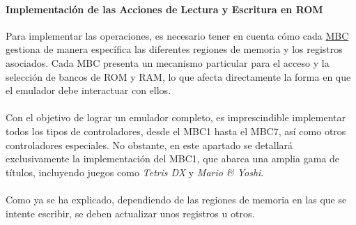 \paragraph{Implementación de las Acciones de Lectura y Escritura en ROM}
Para implementar las operaciones, es necesario tener en cuenta cómo cada \hyperref[history_mbcs]{MBC} gestiona de manera específica las diferentes regiones de memoria y los registros asociados. Cada MBC presenta un mecanismo particular para el acceso y la selección de bancos de ROM y RAM, lo que afecta directamente la forma en que el emulador debe interactuar con ellos.
\\\\
Con el objetivo de lograr un emulador completo, es imprescindible implementar todos los tipos de controladores, desde el MBC1 hasta el MBC7, así como otros controladores especiales. No obstante, en este apartado se detallará exclusivamente la implementación del MBC1, que abarca una amplia gama de títulos, incluyendo juegos como \textit{Tetris DX} y \textit{Mario \& Yoshi}.
\\\\
Como ya se ha explicado, dependiendo de las regiones de memoria en las que se intente escribir, se deben actualizar unos registros u otros.


